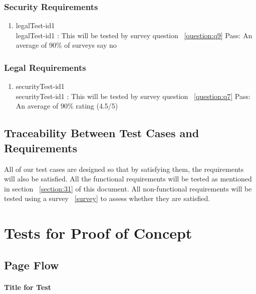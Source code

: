 \documentclass[12pt, titlepage]{article}
\begin{document}
\subsubsection{Security Requirements}
\begin{enumerate}
\item{legalTest-id1\\}
legalTest-id1 : This will be tested by survey question ~\ref{question:q9}
\newline
	Pass: An average of 90\% of surveys say no

\end{enumerate}

\subsubsection{ Legal Requirements}
\begin{enumerate}
\item{securityTest-id1\\}
securityTest-id1 : This will be tested by survey question ~\ref{question:q7}
\newline
	Pass: An average of 90\% rating (4.5/5)


\end{enumerate}

\subsection{Traceability Between Test Cases and Requirements}
All of our test cases are designed so that by satisfying them, the requirements will also be satisfied. All the functional requirements will be tested as mentioned in section ~\ref{section:31} of this document. All non-functional requirements will be tested using a survey ~\ref{survey} to assess whether they are satisfied.

\section{Tests for Proof of Concept}

\subsection{Page Flow}
		
\paragraph{Title for Test}
\end{document}
